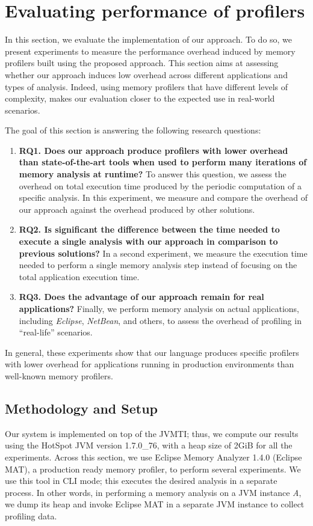 \section{Evaluating performance of profilers}\label{sec:dsl-evaluation}

In this section, we evaluate the implementation of our approach.
To do so, we present experiments to measure the performance overhead induced by memory profilers built using the proposed approach.
This section aims at assessing whether our approach induces low overhead across different applications and types of analysis.
Indeed, using memory profilers that have different levels of complexity, makes our evaluation closer to the expected use in real-world scenarios.

The goal of this section is answering the following research questions:
\begin{enumerate}
\item \textbf{RQ1. Does our approach produce profilers with lower overhead than state-of-the-art tools when used to perform many iterations of memory analysis at runtime?} To answer this question, we assess the overhead on total execution time produced by the periodic computation of a specific analysis.
In this experiment, we measure and compare the overhead of our approach against the overhead produced by other solutions.
\item \textbf{RQ2. Is significant the difference between the time needed to execute a single analysis with our approach in comparison to previous solutions? }
In a second experiment, we measure the execution time needed to perform a single memory analysis step instead of focusing on the total application execution time.
\item \textbf{RQ3. Does the advantage of our approach remain for real applications? }
 Finally, we perform memory analysis on actual applications, including \textit{Eclipse}, \textit{NetBean}, and others, to assess the overhead of profiling in ``real-life'' scenarios. 
\end{enumerate}

In general, these experiments show that our language produces specific profilers with lower overhead for applications running in production environments than well-known memory profilers.

\subsection{Methodology and Setup}\label{sec:MethodologyAndSetup}
Our system is implemented on top of the JVMTI; thus, we compute our results using the HotSpot JVM version 1.7.0\_76, with a heap size of 2GiB for all the experiments.
Across this section, we use Eclipse Memory Analyzer 1.4.0 (Eclipse MAT), a production ready memory profiler, to perform several experiments.
We use this tool in \gls{CLI} mode; this executes the desired analysis in a separate process.
In other words, in performing a memory analysis on a JVM instance \textit{A}, we dump its heap and invoke Eclipse MAT in a separate JVM instance to collect profiling data.

